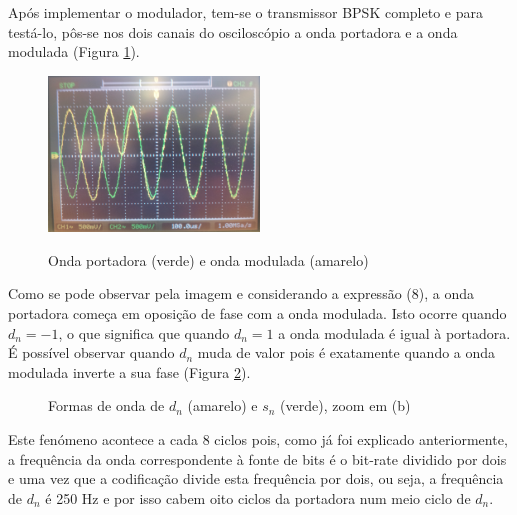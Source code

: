 \documentclass[11pt]{article}
\numberwithin{equation}{section}
\begin{document}
Após implementar o modulador, tem-se o transmissor BPSK completo e para testá-lo, pôs-se nos dois canais do osciloscópio a onda portadora e a onda modulada (Figura \ref{port_mod}).
\begin{figure}[H]
	\centering
	\includegraphics[width=0.5\textwidth]{./port_mod}~\\
	\caption{Onda portadora (verde) e onda modulada (amarelo)}
	\label{port_mod}
\end{figure}
 \vspace{2 mm}
 
 Como se pode observar pela imagem e considerando a expressão (8), a onda portadora começa em oposição de fase com a onda modulada. Isto ocorre quando $d_n=-1$, o que significa que quando $d_n=1$ a onda modulada é igual à portadora. É possível observar quando $d_n$ muda de valor pois é exatamente quando a onda modulada inverte a sua fase (Figura \ref{dn_mod}). 
 \begin{figure}[h]
 	\centering
 	\hspace{6 mm}
 	\caption{Formas de onda de $d_n$ (amarelo) e $s_n$ (verde), zoom em (b)}
 	\label{dn_mod}
 \end{figure}
 
 Este fenómeno acontece a cada 8 ciclos pois, como já foi explicado anteriormente, a frequência da onda correspondente à fonte de bits é o bit-rate dividido por dois e uma vez que a codificação divide esta frequência por dois, ou seja, a frequência de $d_n$ é 250 Hz e por isso cabem oito ciclos da portadora num meio ciclo de $d_n$.
 \vspace{2 mm}
\end{document}
